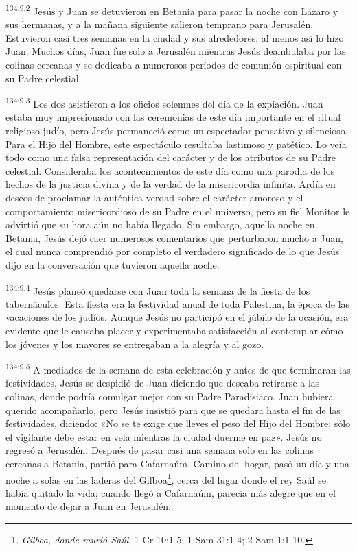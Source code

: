 \par
\textsuperscript{134:9.2} Jesús y Juan se detuvieron en Betania para pasar la noche con Lázaro y sus hermanas, y a la mañana siguiente salieron temprano para Jerusalén. Estuvieron casi tres semanas en la ciudad y sus alrededores, al menos así lo hizo Juan. Muchos días, Juan fue solo a Jerusalén mientras Jesús deambulaba por las colinas cercanas y se dedicaba a numerosos períodos de comunión espiritual con su Padre celestial.

\par
\textsuperscript{134:9.3} Los dos asistieron a los oficios solemnes del día de la expiación. Juan estaba muy impresionado con las ceremonias de este día importante en el ritual religioso judío, pero Jesús permaneció como un espectador pensativo y silencioso. Para el Hijo del Hombre, este espectáculo resultaba lastimoso y patético. Lo veía todo como una falsa representación del carácter y de los atributos de su Padre celestial. Consideraba los acontecimientos de este día como una parodia de los hechos de la justicia divina y de la verdad de la misericordia infinita. Ardía en deseos de proclamar la auténtica verdad sobre el carácter amoroso y el comportamiento misericordioso de su Padre en el universo, pero su fiel Monitor le advirtió que su hora aún no había llegado. Sin embargo, aquella noche en Betania, Jesús dejó caer numerosos comentarios que perturbaron mucho a Juan, el cual nunca comprendió por completo el verdadero significado de lo que Jesús dijo en la conversación que tuvieron aquella noche.

\par
\textsuperscript{134:9.4} Jesús planeó quedarse con Juan toda la semana de la fiesta de los tabernáculos. Esta fiesta era la festividad anual de toda Palestina, la época de las vacaciones de los judíos. Aunque Jesús no participó en el júbilo de la ocasión, era evidente que le causaba placer y experimentaba satisfacción al contemplar cómo los jóvenes y los mayores se entregaban a la alegría y al gozo.

\par
\textsuperscript{134:9.5} A mediados de la semana de esta celebración y antes de que terminaran las festividades, Jesús se despidió de Juan diciendo que deseaba retirarse a las colinas, donde podría comulgar mejor con su Padre Paradisiaco. Juan hubiera querido acompañarlo, pero Jesús insistió para que se quedara hasta el fin de las festividades, diciendo: «No se te exige que lleves el peso del Hijo del Hombre; sólo el vigilante debe estar en vela mientras la ciudad duerme en paz». Jesús no regresó a Jerusalén. Después de pasar casi una semana solo en las colinas cercanas a Betania, partió para Cafarnaúm. Camino del hogar, pasó un día y una noche a solas en las laderas del Gilboa\footnote{\textit{Gilboa, donde murió Saúl}: 1 Cr 10:1-5; 1 Sam 31:1-4; 2 Sam 1:1-10.}, cerca del lugar donde el rey Saúl se había quitado la vida; cuando llegó a Cafarnaúm, parecía más alegre que en el momento de dejar a Juan en Jerusalén.

